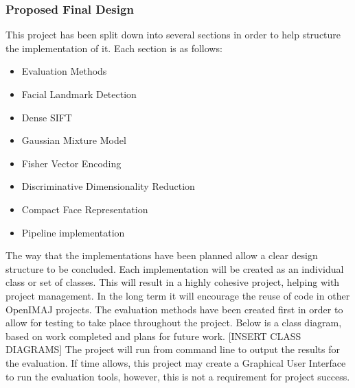 \documentclass[12pt, a4paper]{article}
\begin{document}
\subsubsection{Proposed Final Design}
This project has been split down into several sections in order to help structure the implementation of it. Each section is as follows:
\begin{itemize}
\item Evaluation Methods
\item Facial Landmark Detection
\item Dense SIFT
\item Gaussian Mixture Model
\item Fisher Vector Encoding
\item Discriminative Dimensionality Reduction
\item Compact Face Representation
\item Pipeline implementation
\end{itemize}
The way that the implementations have been planned allow a clear design structure to be concluded. Each implementation will be created as an individual class or set of classes. This will result in a highly cohesive project, helping with project management. In the long term it will encourage the reuse of code in other OpenIMAJ projects. The evaluation methods have been created first in order to allow for testing to take place throughout the project. Below is a class diagram, based on work completed and plans for future work.
[INSERT CLASS DIAGRAMS]
The project will run from command line to output the results for the evaluation. If time allows, this project may create a Graphical User Interface to run the evaluation tools, however, this is not a requirement for project success.
\end{document}
